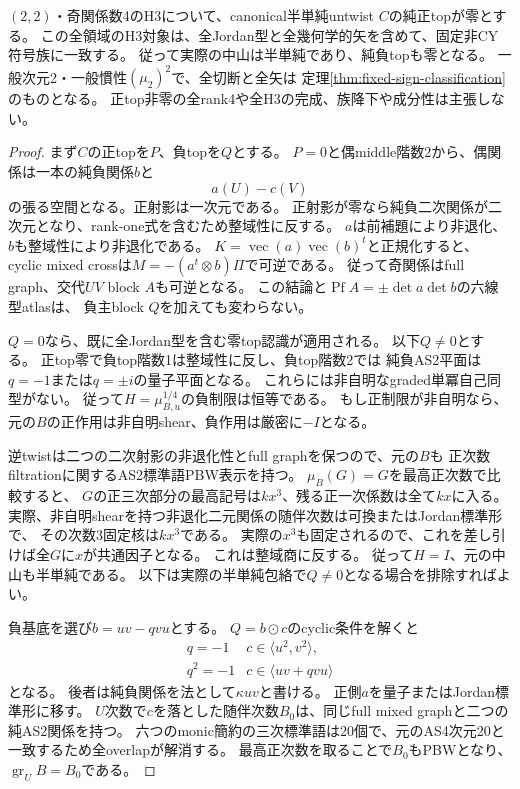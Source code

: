 \begin{theorem}\label{thm:h3-order2-22-Pzero-nondegenerate}
\label{thm:h3-order2-22-Pzero-classification}
$(2,2)$・奇関係数4のH3について、canonical半単純untwist $C$の純正topが零とする。
この全領域のH3対象は、全Jordan型と全幾何学的矢を含めて、固定非CY符号族に一致する。
従って実際の中山は半単純であり、純負topも零となる。
一般次元2・一般慣性$(\mu_2)^2$で、全切断と全矢は
定理\ref{thm:fixed-sign-classification}のものとなる。
正top非零の全rank4や全H3の完成、族降下や成分性は主張しない。
\end{theorem}
\begin{proof}
まず$C$の正topを$P$、負topを$Q$とする。
$P=0$と偶middle階数2から、偶関係は一本の純負関係$b$と
\[
 a(U)-c(V)
\]
の張る空間となる。正射影は一次元である。
正射影が零なら純負二次関係が二次元となり、rank-one式を含むため整域性に反する。
$a$は前補題により非退化、$b$も整域性により非退化である。
$K=\operatorname{vec}(a)\operatorname{vec}(b)^t$と正規化すると、
cyclic mixed crossは$M=-(a^t\otimes b)\Pi$で可逆である。
従って奇関係はfull graph、交代$UV$ block $A$も可逆となる。
この結論と$\operatorname{Pf}A=\pm\det a\det b$の六線型atlasは、
負主block $Q$を加えても変わらない。

$Q=0$なら、既に全Jordan型を含む零top認識が適用される。
以下$Q\ne0$とする。
正top零で負top階数1は整域性に反し、負top階数2では
純負AS2平面は$q=-1$または$q=\pm i$の量子平面となる。
これらには非自明なgraded単冪自己同型がない。
従って$H=\mu_{B,u}^{1/4}$の負制限は恒等である。
もし正制限が非自明なら、元の$B$の正作用は非自明shear、負作用は厳密に$-I$となる。

逆twistは二つの二次射影の非退化性とfull graphを保つので、元の$B$も
正次数filtrationに関するAS2標準語PBW表示を持つ。
$\mu_B(G)=G$を最高正次数で比較すると、
$G$の正三次部分の最高記号は$kx^3$、残る正一次係数は全て$kx$に入る。
実際、非自明shearを持つ非退化二元関係の随伴次数は可換またはJordan標準形で、
その次数3固定核は$kx^3$である。
実際の$x^3$も固定されるので、これを差し引けば全$G$に$x$が共通因子となる。
これは整域商に反する。
従って$H=I$、元の中山も半単純である。
以下は実際の半単純包絡で$Q\ne0$となる場合を排除すればよい。

負基底を選び$b=uv-qvu$とする。
$Q=b\mathbin{\odot}c$のcyclic条件を解くと
\[
\begin{array}{c|c}
q=-1&c\in\langle u^2,v^2\rangle,\\
q^2=-1&c\in\langle uv+qvu\rangle
\end{array}
\]
となる。
後者は純負関係を法として$\kappa uv$と書ける。
正側$a$を量子またはJordan標準形に移す。
$U$次数で$c$を落とした随伴次数$B_0$は、同じfull mixed graphと二つの純AS2関係を持つ。
六つのmonic簡約の三次標準語は20個で、元のAS4次元20と一致するため全overlapが解消する。
最高正次数を取ることで$B_0$もPBWとなり、$\operatorname{gr}_U B=B_0$である。


\end{proof}
